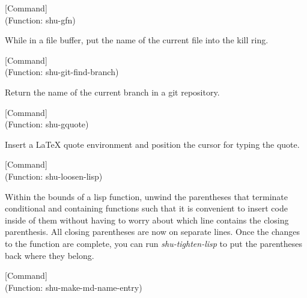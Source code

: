 \vspace{1em}
\noindent
{}
\usebox{\funcname}
 \hfill [Command]\\%
 (Function: shu-gfn)

\begin{doc-string}
While in a file buffer, put the name of the current file into the kill ring.
\end{doc-string}

\vspace{1em}
\noindent
{}
\usebox{\funcname}
 \hfill [Command]\\%
 (Function: shu-git-find-branch)

\begin{doc-string}
Return the name of the current branch in a git repository.
\end{doc-string}

\vspace{1em}
\noindent
{}
\usebox{\funcname}
 \hfill [Command]\\%
 (Function: shu-gquote)

\begin{doc-string}
Insert a LaTeX quote environment and position the cursor for typing the quote.
\end{doc-string}

\vspace{1em}
\noindent
{}
\usebox{\funcname}
 \hfill [Command]\\%
 (Function: shu-loosen-lisp)

\begin{doc-string}
Within the bounds of a lisp function, unwind the parentheses that terminate
conditional and containing functions such that it is convenient to insert code
inside of them without having to worry about which line contains the closing
parenthesis.  All closing parentheses are now on separate lines.  Once the
changes to the function are complete, you can run \emph{shu-tighten-lisp} to put the
parentheses back where they belong.
\end{doc-string}

\vspace{1em}
\noindent
{}
\usebox{\funcname}
 \hfill [Command]\\%
 (Function: shu-make-md-name-entry)

